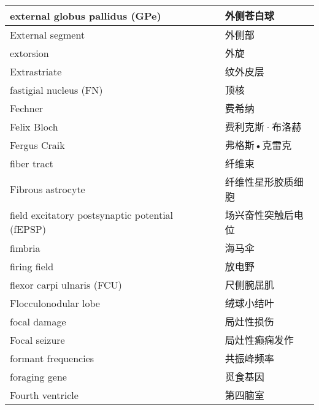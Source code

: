 \begin{longtable}{lll}
	\midrule
	external globus pallidus (GPe)     && 外侧苍白球   \\
	
	\midrule
	External segment     && 外侧部   \\
	
	\midrule
	extorsion     && 外旋   \\
	
	\midrule
	Extrastriate     && 纹外皮层   \\
	
	\midrule
	fastigial nucleus (FN)     &&  顶核  \\
	
	\midrule
	Fechner     &&  费希纳  \\
	
	\midrule
	Felix Bloch     &&  费利克斯·布洛赫  \\
	
	\midrule
	Fergus Craik     &&  弗格斯•克雷克  \\
	
	\midrule
	fiber tract     &&  纤维束  \\
	
	\midrule
	Fibrous astrocyte     &&  纤维性星形胶质细胞  \\
	
	\midrule
	field excitatory postsynaptic potential (fEPSP)     &&  场兴奋性突触后电位  \\
	
	\midrule
	fimbria     &&  海马伞  \\
	
	\midrule
	firing field     &&  放电野  \\
	
	\midrule
	flexor carpi ulnaris (FCU)     &&  尺侧腕屈肌  \\
	
	\midrule
	Flocculonodular lobe     &&  绒球小结叶  \\
	
	\midrule
	focal damage     &&  局灶性损伤  \\
	
	\midrule
	Focal seizure     &&  局灶性癫痫发作  \\
	
	\midrule
	formant frequencies     &&  共振峰频率  \\
	
	\midrule
	foraging gene     &&  觅食基因  \\
	
	\midrule
	Fourth ventricle     &&  第四脑室  \\
	

\end{longtable}
